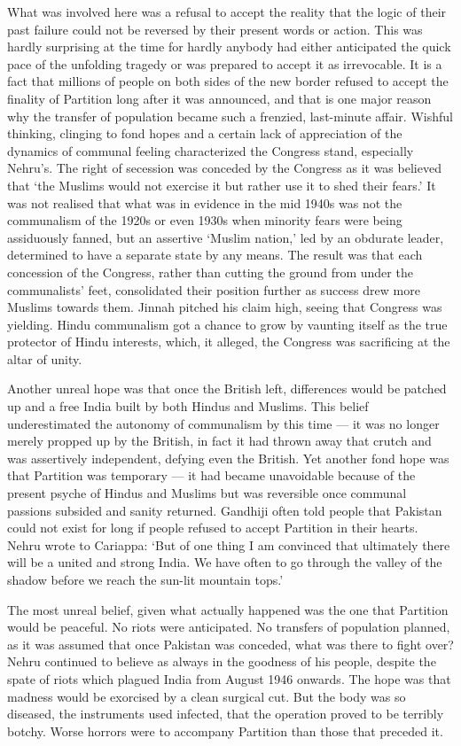 What was involved here was a refusal to accept the reality that the logic of their past failure could not be reversed by their present words or action. This was hardly surprising at the time for hardly anybody had either anticipated the quick pace of the unfolding tragedy or was prepared to accept it as irrevocable. It is a fact that millions of people on both sides of the new border refused to accept the finality of Partition long after it was announced, and that is one major reason why the transfer of population became such a frenzied, last-minute affair. Wishful thinking, clinging to fond hopes and a certain lack of appreciation of the dynamics of communal feeling characterized the Congress stand, especially Nehru's. The right of secession was conceded by the Congress as it was believed that `the Muslims would not exercise it but rather use it to shed their fears.' It was not realised that what was in evidence in the mid­ 1940s was not the communalism of the 1920s or even 1930s when minority fears were being assiduously fanned, but an assertive `Muslim nation,' led by an obdurate leader, determined to have a separate state by any means. The result was that each concession of the Congress, rather than cutting the ground from under the communalists' feet, consolidated their position further as success drew more Muslims towards them. Jinnah pitched his claim high, seeing that Congress was yielding. Hindu communalism got a chance to grow by vaunting itself as the true protector of Hindu interests, which, it alleged, the Congress was sacrificing at the altar of unity. 

Another unreal hope was that once the British left, differences would be patched up and a free India built by both Hindus and Muslims. This belief underestimated the autonomy of communalism by this time — it was no longer merely propped up by the British, in fact it had thrown away that crutch and was assertively independent, defying even the British. Yet another fond hope was that Partition was temporary — it had became unavoidable because of the present psyche of Hindus and Muslims but was reversible once communal passions subsided and sanity returned. Gandhiji often told people that Pakistan could not exist for long if people refused to accept Partition in their hearts. Nehru wrote to Cariappa: `But of one thing I am convinced that ultimately there will be a united and strong India. We have often to go through the valley of the shadow before we reach the sun-lit mountain tops.' 

The most unreal belief, given what actually happened was the one that Partition would be peaceful. No riots were anticipated. No transfers of population planned, as it was assumed that once Pakistan was conceded, what was there to fight over? Nehru continued to believe as always in the goodness of his people, despite the spate of riots which plagued India from August 1946 onwards. The hope was that madness would be exorcised by a clean surgical cut. But the body was so diseased, the instruments used infected, that the operation proved to be terribly botchy. Worse horrors were to accompany Partition than those that preceded it. 

